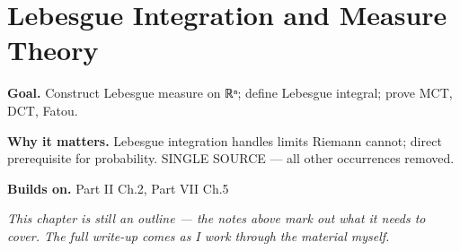 \chapter{Lebesgue Integration and Measure Theory}
\label{ch:07-real-analysis-and-measure-theory-06}

\begin{chapterintro}
\textbf{Goal.} Construct Lebesgue measure on ℝⁿ; define Lebesgue integral; prove MCT, DCT, Fatou.

\textbf{Why it matters.} Lebesgue integration handles limits Riemann cannot; direct prerequisite for probability. SINGLE SOURCE — all other occurrences removed.

\textbf{Builds on.} Part II Ch.2, Part VII Ch.5
\end{chapterintro}

\textit{This chapter is still an outline --- the notes above mark out what it needs to cover. The full write-up comes as I work through the material myself.}
